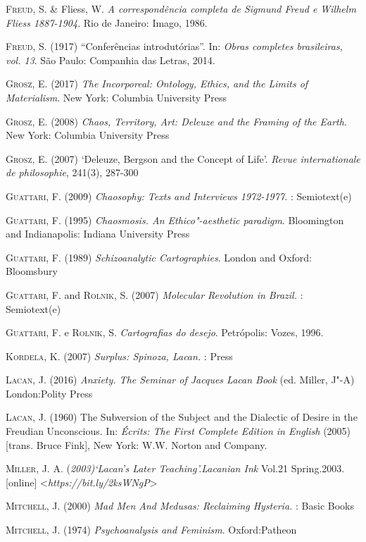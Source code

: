 \textsc{Freud}, S. \& Fliess, W. \emph{A correspondência completa de Sigmund
Freud e Wilhelm Fliess 1887-1904}. Rio de Janeiro: Imago, 1986.

\textsc{Freud}, S. (1917) ``Conferências introdutórias''. In: \emph{Obras
completes brasileiras, vol. 13}. São Paulo: Companhia das Letras, 2014.

\textsc{Grosz}, E. (2017) \emph{The Incorporeal: Ontology, Ethics, and the Limits
of Materialism}. New York: Columbia University Press

\textsc{Grosz}, E. (2008) \emph{Chaos, Territory, Art: Deleuze and the Framing of
the Earth}. New York: Columbia University Press

\textsc{Grosz}, E. (2007) `Deleuze, Bergson and the Concept of Life'. \emph{Revue
internationale de philosophie}, 241(3), 287-300

\textsc{Guattari}, F. (2009) \emph{Chaosophy: Texts and Interviews 1972-1977.}
: Semiotext(e)

\textsc{Guattari}, F. (1995) \emph{Chaosmosis. An Ethico"-aesthetic paradigm}.
Bloomington and Indianapolis: Indiana University Press

\textsc{Guattari}, F. (1989) \emph{Schizoanalytic Cartographies}. London and
Oxford: Bloomsbury

\textsc{Guattari}, F. and \textsc{Rolnik}, S. (2007) \emph{Molecular Revolution in
Brazil.} : Semiotext(e)

\textsc{Guattari}, F. e \textsc{Rolnik}, S. \emph{Cartografias do desejo}. Petrópolis:
Vozes, 1996.

\textsc{Kordela}, K. (2007) \emph{Surplus: Spinoza, Lacan.} :  Press

\textsc{Lacan}, J. (2016) \emph{Anxiety. The Seminar of Jacques Lacan Book } (ed.
Miller, J"-A) London:Polity Press

\textsc{Lacan}, J. (1960) The Subversion of the Subject and the Dialectic of
Desire in the Freudian Unconscious. In: \emph{Écrits: The First Complete
Edition in English} (2005) {[}trans. Bruce Fink{]}, New York: W.W.
Norton and Company.

\textsc{Miller}, J. A. (\emph{2003)`Lacan's Later Teaching'.Lacanian Ink} Vol.21
Spring.2003. {[}online{]}
\textless{}\emph{https://bit.ly/2ksWNgP}\textgreater{}

\textsc{Mitchell}, J. (2000) \emph{Mad Men And Medusas: Reclaiming Hysteria.} :
Basic Books

\textsc{Mitchell}, J. (1974) \emph{Psychoanalysis and Feminism}. Oxford:Patheon

